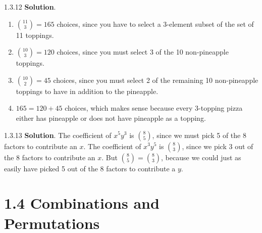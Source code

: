 \documentclass[11pt,]{book}
\theoremstyle{ptxplainnotitle}
\theoremstyle{ptxplaintitle}
\theoremstyle{ptxdefinitionnotitle}
\theoremstyle{ptxdefinitiontitle}
\theoremstyle{ptxdefinitionnotitle}
\theoremstyle{ptxdefinitiontitle}
\theoremstyle{ptxdefinitionnotitle}
\theoremstyle{ptxdefinitiontitle}
\theoremstyle{ptxdefinitiontitlenonumber}
\theoremstyle{ptxdefinitiontitlenonumber}
\numberwithin{equation}{chapter}
\begin{document}
\begin{divisionexercise}{1.3.12}
\textbf{Solution}.\quad%
\hypertarget{p-1500}{}%
\leavevmode%
\begin{enumerate}[label=\alph*.]
\item\hypertarget{li-657}{}\hypertarget{p-1501}{}%
\({11 \choose 3} = 165\) choices, since you have to select a 3-element subset of the set of 11 toppings.%
\item\hypertarget{li-658}{}\hypertarget{p-1502}{}%
\({10 \choose 3} = 120\) choices, since you must select 3 of the 10 non-pineapple toppings.%
\item\hypertarget{li-659}{}\hypertarget{p-1503}{}%
\({10 \choose 2} = 45\) choices, since you must select 2 of the remaining 10 non-pineapple toppings to have in addition to the pineapple.%
\item\hypertarget{li-660}{}\hypertarget{p-1504}{}%
\(165  = 120 + 45\) choices, which makes sense because every 3-topping pizza either has pineapple or does not have pineapple as a topping.%
\end{enumerate}
%
\end{divisionexercise}%
\begin{divisionexercise}{1.3.13}
\textbf{Solution}.\quad%
\hypertarget{p-1506}{}%
The coefficient of \(x^5y^3\) is \({8\choose 5}\), since we must pick 5 of the 8 factors to contribute an \(x\). The coefficient of \(x^3y^5\) is \({8 \choose 3}\), since we pick 3 out of the 8 factors to contribute an \(x\). But \({8 \choose 5} = {8\choose 3}\), because we could just as easily have picked 5 out of the 8 factors to contribute a \(y\).%
\end{divisionexercise}%
\section*{1.4 Combinations and Permutations}
\end{document}
